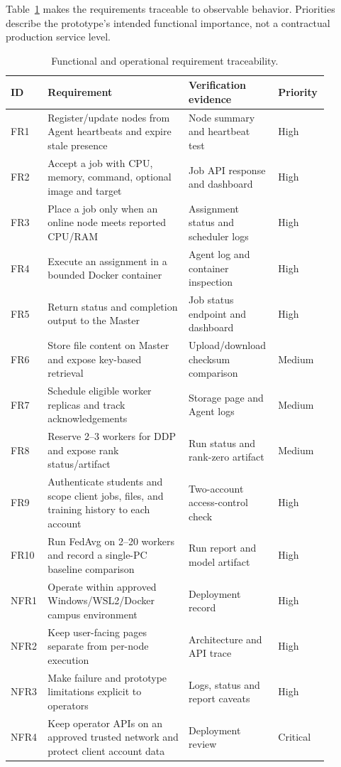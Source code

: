 \documentclass{article}
\begin{document}
Table~\ref{tab:requirements} makes the requirements traceable to observable behavior. Priorities describe the prototype's intended functional importance, not a contractual production service level.
\begin{table}[h!]
\centering
\caption{Functional and operational requirement traceability.}
\label{tab:requirements}
\begin{tabular}{|p{0.1\linewidth}|p{0.43\linewidth}|p{0.24\linewidth}|p{0.12\linewidth}|}
\hline
ID & Requirement & Verification evidence & Priority \\
\hline
FR1 & Register/update nodes from Agent heartbeats and expire stale presence & Node summary and heartbeat test & High \\
\hline
FR2 & Accept a job with CPU, memory, command, optional image and target & Job API response and dashboard & High \\
\hline
FR3 & Place a job only when an online node meets reported CPU/RAM & Assignment status and scheduler logs & High \\
\hline
FR4 & Execute an assignment in a bounded Docker container & Agent log and container inspection & High \\
\hline
FR5 & Return status and completion output to the Master & Job status endpoint and dashboard & High \\
\hline
FR6 & Store file content on Master and expose key-based retrieval & Upload/download checksum comparison & Medium \\
\hline
FR7 & Schedule eligible worker replicas and track acknowledgements & Storage page and Agent logs & Medium \\
\hline
FR8 & Reserve 2--3 workers for DDP and expose rank status/artifact & Run status and rank-zero artifact & Medium \\
\hline
FR9 & Authenticate students and scope client jobs, files, and training history to each account & Two-account access-control check & High \\
\hline
FR10 & Run FedAvg on 2--20 workers and record a single-PC baseline comparison & Run report and model artifact & High \\
\hline
NFR1 & Operate within approved Windows/WSL2/Docker campus environment & Deployment record & High \\
\hline
NFR2 & Keep user-facing pages separate from per-node execution & Architecture and API trace & High \\
\hline
NFR3 & Make failure and prototype limitations explicit to operators & Logs, status and report caveats & High \\
\hline
NFR4 & Keep operator APIs on an approved trusted network and protect client account data & Deployment review & Critical \\
\hline
\end{tabular}
\end{table}
\end{document}
